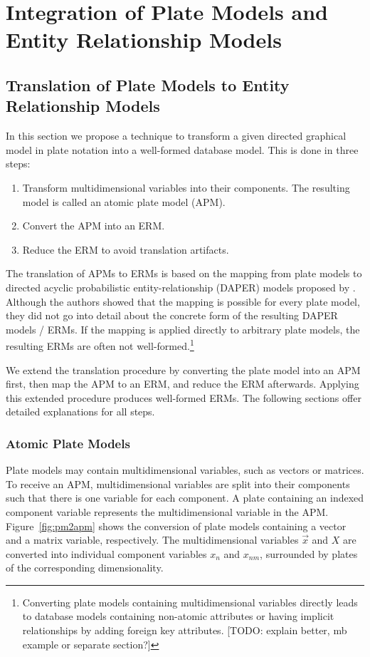 \section{Integration of Plate Models and Entity Relationship Models}

\subsection{Translation of Plate Models to Entity Relationship Models}

In this section we propose a technique to transform a given directed graphical model in plate notation into a well-formed database model. This is done in three steps:
\begin{enumerate}
\item Transform multidimensional variables into their components. The resulting model is called an atomic plate model (APM).
\item\label{itm:apm2erm} Convert the APM into an ERM.
\item Reduce the ERM to avoid translation artifacts.
\end{enumerate}
The translation of APMs to ERMs is based on the mapping from plate models to directed acyclic probabilistic entity-relationship (DAPER) models proposed by \textcite{heckerman2007probabilistic}. Although the authors showed that the mapping is possible for every plate model, they did not go into detail about the concrete form of the resulting DAPER models / ERMs. If the mapping is applied directly to arbitrary plate models, the resulting ERMs are often not well-formed.\footnote{Converting plate models containing multidimensional variables directly leads to database models containing non-atomic attributes or having implicit relationships by adding foreign key attributes. [TODO: explain better, mb example or separate section?]}

We extend the translation procedure by converting the plate model into an APM first, then map the APM to an ERM, and reduce the ERM afterwards. Applying this extended procedure produces well-formed ERMs. The following sections offer detailed explanations for all steps.

\subsubsection{Atomic Plate Models}

Plate models may contain multidimensional variables, such as vectors or matrices. To receive an APM, multidimensional variables are split into their components such that there is one variable for each component. A plate containing an indexed component variable represents the multidimensional variable in the APM. Figure~\ref{fig:pm2apm} shows the conversion of plate models containing a vector and a matrix variable, respectively. The multidimensional variables $\vec x$ and $X$ are converted into individual component variables $x_n$ and $x_{nm}$, surrounded by plates of the corresponding dimensionality.

